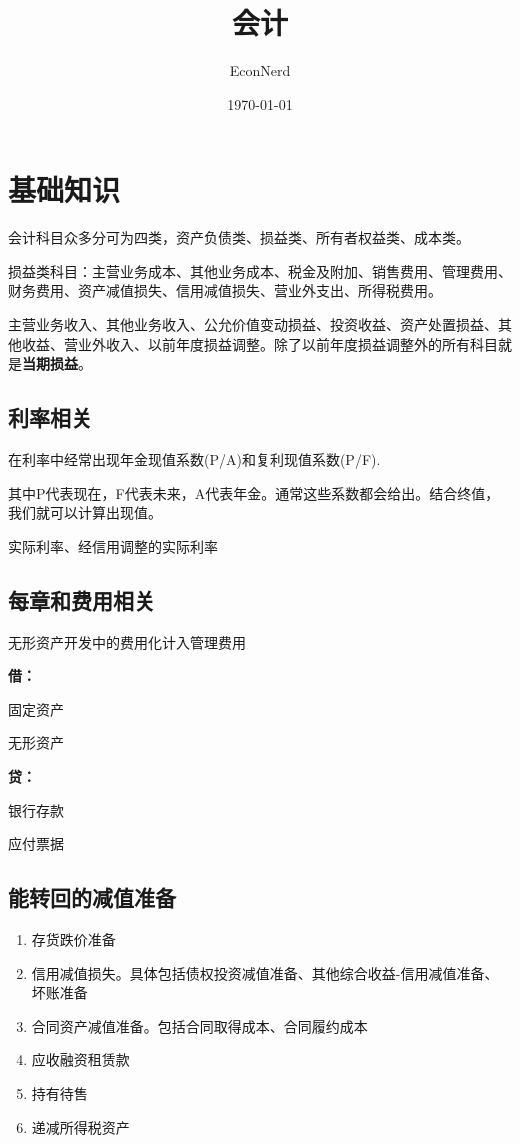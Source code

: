 \documentclass[UTF8,12pt]{ctexart}
\title{会计} %
\author{EconNerd}
\date{\today}
\newenvironment{Dr}{%
	\begin{list}{}%
		{
			\setlength{\leftmargin}{2em}
			\setlength{\labelwidth}{2em}
			\setlength{\labelsep}{0pt}
			\setlength{\itemindent}{0pt}
			\setlength{\listparindent}{0pt}
			\setlength{\parsep}{0pt}
			\setlength{\topsep}{0pt}
		}
		\item[\textbf{借：}]
	}{%
	\end{list}
}
\newenvironment{Cr}{%
	\begin{list}{}%
		{
			\setlength{\leftmargin}{2em}
			\setlength{\labelwidth}{2em}
			\setlength{\labelsep}{0pt}
			\setlength{\itemindent}{0pt}
			\setlength{\listparindent}{0pt}
			\setlength{\parsep}{0pt}
			\setlength{\topsep}{0pt}
		}
		\item[\textbf{贷：}]
	}{%
	\end{list}
}
\numberwithin{equation}{section} %
\numberwithin{figure}{section}
\numberwithin{table}{section}
\begin{document}
	\maketitle
	\tableofcontents
	\newpage
	
	\section{基础知识}
	
	会计科目众多分可为四类，资产负债类、损益类、所有者权益类、成本类。
	
	损益类科目：主营业务成本、其他业务成本、税金及附加、销售费用、管理费用、财务费用、资产减值损失、信用减值损失、营业外支出、所得税费用。
	
	主营业务收入、其他业务收入、公允价值变动损益、投资收益、资产处置损益、其他收益、营业外收入、以前年度损益调整。除了以前年度损益调整外的所有科目就是\textbf{当期损益}。
	
	\subsection{利率相关}
	在利率中经常出现年金现值系数(P/A)和复利现值系数(P/F).
	
	其中P代表现在，F代表未来，A代表年金。通常这些系数都会给出。结合终值，我们就可以计算出现值。
	
	实际利率、经信用调整的实际利率
	
	\subsection{每章和费用相关}
	无形资产开发中的费用化计入管理费用

	\begin{Dr}
		固定资产 \par
		无形资产
	\end{Dr}
	\begin{Cr}
		银行存款
		
		应付票据
	\end{Cr}

	\subsection{能转回的减值准备}
	\begin{enumerate}
		\item 存货跌价准备
		
		\item 信用减值损失。具体包括债权投资减值准备、其他综合收益-信用减值准备、坏账准备
		
		\item 合同资产减值准备。包括合同取得成本、合同履约成本
		
		\item 应收融资租赁款
		
		\item 持有待售
		
		\item 递减所得税资产
	\end{enumerate}
	
\end{document}
